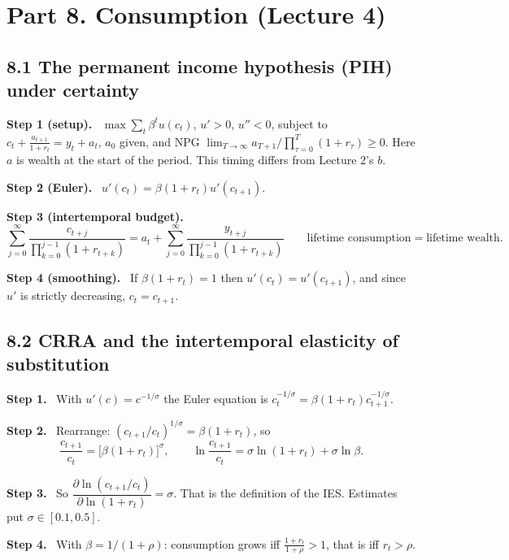 \documentclass[12pt]{article}
\newcommand{\st}[1]{\par\smallskip\textbf{Step #1.}\ }
\newcommand{\ans}[1]{\[\boxed{\ #1\ }\]}
\begin{document}
\section*{Part 8. Consumption (Lecture 4)}

\subsection*{8.1 The permanent income hypothesis (PIH) under certainty}
\st{1 (setup)} $\max\sum_t\beta^tu(c_t)$, $u'>0$, $u''<0$, subject to
$c_t+\frac{a_{t+1}}{1+r_t}=y_t+a_t$, $a_0$ given, and NPG
$\lim_{T\to\infty}a_{T+1}/\prod_{\tau=0}^{T}(1+r_\tau)\ge0$.
Here $a$ is wealth at the start of the period. This timing differs from Lecture 2's $b$.
\st{2 (Euler)} $u'(c_t)=\beta(1+r_t)u'(c_{t+1})$.
\st{3 (intertemporal budget)}
\[
\sum_{j=0}^\infty\frac{c_{t+j}}{\prod_{k=0}^{j-1}(1+r_{t+k})}=a_t+\sum_{j=0}^\infty\frac{y_{t+j}}{\prod_{k=0}^{j-1}(1+r_{t+k})}\qquad\text{lifetime consumption}=\text{lifetime wealth.}
\]
\st{4 (smoothing)} If $\beta(1+r_t)=1$ then $u'(c_t)=u'(c_{t+1})$, and since $u'$ is strictly decreasing, $c_t=c_{t+1}$.

\subsection*{8.2 CRRA and the intertemporal elasticity of substitution}
\st{1} With $u'(c)=c^{-1/\sigma}$ the Euler equation is $c_t^{-1/\sigma}=\beta(1+r_t)c_{t+1}^{-1/\sigma}$.
\st{2} Rearrange: $(c_{t+1}/c_t)^{1/\sigma}=\beta(1+r_t)$, so
\ans{\frac{c_{t+1}}{c_t}=\big[\beta(1+r_t)\big]^\sigma,\qquad\ln\frac{c_{t+1}}{c_t}=\sigma\ln(1+r_t)+\sigma\ln\beta .}
\st{3} So $\dfrac{\partial\ln(c_{t+1}/c_t)}{\partial\ln(1+r_t)}=\sigma$. That is the definition of the IES. Estimates put $\sigma\in[0.1,0.5]$.
\st{4} With $\beta=1/(1+\rho)$: consumption grows iff $\frac{1+r_t}{1+\rho}>1$, that is iff $r_t>\rho$.
\end{document}

